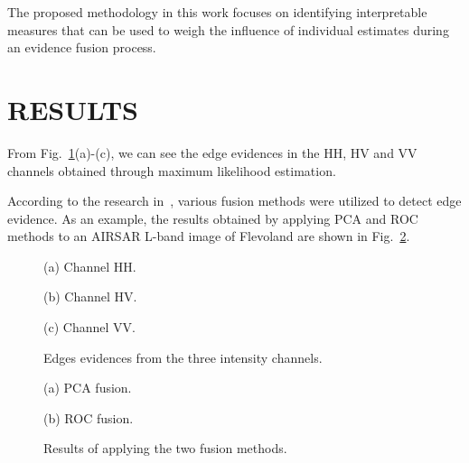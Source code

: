 \documentclass{article}
\begin{document}
The proposed methodology in this work focuses on identifying interpretable measures that can be used to weigh the influence of individual estimates during an evidence fusion process.
\section{RESULTS}

From Fig.~\ref{fig:res}(a)-(c), we can see the edge evidences in the HH, HV and VV channels obtained through maximum likelihood estimation.\par
According to the research in~\cite{DeBorba2020}, various fusion methods were utilized to detect edge evidence. As an example, the results obtained by applying PCA and ROC methods to an AIRSAR L-band image of Flevoland are shown in Fig.~\ref{fig:2}.%

 \begin{figure}[htb]
\begin{minipage}[b]{1.0\linewidth}
  \centering
 \centerline{}
  \vspace{-0.1cm}
  \centerline{(a) Channel HH.}\medskip
\end{minipage}
%
\begin{minipage}[b]{.48\linewidth}
  \centering
\centerline{}
  \vspace{-0.1cm}
  \centerline{(b) Channel HV.}\medskip
\end{minipage}
\hfill
\begin{minipage}[b]{0.48\linewidth}
  \centering
 \centerline{}
  \vspace{-0.1cm}
  \centerline{(c) Channel VV.}\medskip
\end{minipage}
%
\caption{Edges evidences from the three intensity channels.}
\label{fig:res}
%
\end{figure}
 \begin{figure}[htb]
\begin{minipage}[b]{.48\linewidth}
  \centering
\centerline{}
  \vspace{-0.1cm}
  \centerline{(a) PCA fusion.}\medskip
\end{minipage}
\hfill
\begin{minipage}[b]{0.48\linewidth}
  \centering
 \centerline{}
  \vspace{-0.1cm}
  \centerline{(b) ROC fusion.}\medskip
\end{minipage}
%
\caption{Results of applying the two fusion methods.}
\label{fig:2}
%
\end{figure}
\end{document}
